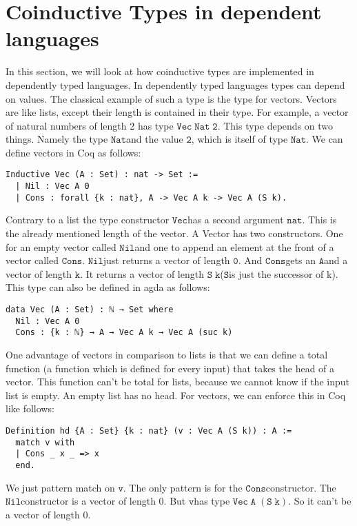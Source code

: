 \documentclass[a4paper,cleardoubleempty,BCOR1cm]{scrbook}
\begin{document}
\chapter{Coinductive Types in dependent languages}
\label{sec:orgb5a19f8}
In this section, we will look at how coinductive types are implemented in
dependently typed languages. In dependently typed languages types can depend on
values. The classical example of such a type is the type for vectors. Vectors are like
lists, except their length is contained in their type. For example, a vector of
natural numbers of length 2 has type $\mathtt{Vec\;Nat\;2}$. This type depends on two
things. Namely the type $\mathtt{Nat}$\;and the value $\mathtt{2}$, which is itself of type $\mathtt{Nat}$.
We can define vectors in Coq as follows:
\begin{verbatim}
Inductive Vec (A : Set) : nat -> Set :=
  | Nil : Vec A 0
  | Cons : forall {k : nat}, A -> Vec A k -> Vec A (S k).
\end{verbatim}
Contrary to a list the type constructor $\mathtt{Vec}$\;has a second argument $\mathtt{nat}$.
This is the already mentioned length of the vector. A Vector has two
constructors. One for an empty vector called $\mathtt{Nil}$\;and one to append an
element at the front of a vector called $\mathtt{Cons}$. $\mathtt{Nil}$\;just returns a vector
of length $\mathtt{0}$. And $\mathtt{Cons}$\;gets an $\mathtt{A}$\;and a vector of length $\mathtt{k}$. It returns a
vector of length $\mathtt{S\;k}$\;($\mathtt{S}$\;is just the successor of k). This type can also be
defined in agda as follows:
\begin{verbatim}
data Vec (A : Set) : ℕ → Set where
  Nil : Vec A 0
  Cons : {k : ℕ} → A → Vec A k → Vec A (suc k)
\end{verbatim}
One advantage of vectors in comparison to lists is that we can define a total function
(a function which is defined for every input) that takes the head of a
vector. This function can't be total for lists, because we cannot know if the
input list is empty. An empty list has no head. For vectors, we can enforce this
in Coq like follows:
\begin{verbatim}
Definition hd {A : Set} {k : nat} (v : Vec A (S k)) : A :=
  match v with
  | Cons _ x _ => x
  end.
\end{verbatim}
We just pattern match on $\mathtt{v}$.  The only pattern is for the $\mathtt{Cons}$\;constructor.  The $\mathtt{Nil}$\;constructor
is a vector of length 0.  But $\mathtt{v}$\;has type $\mathtt{Vec\;A\;(S\;k)}$.  So it can't be a vector of length 0.
\end{document}

